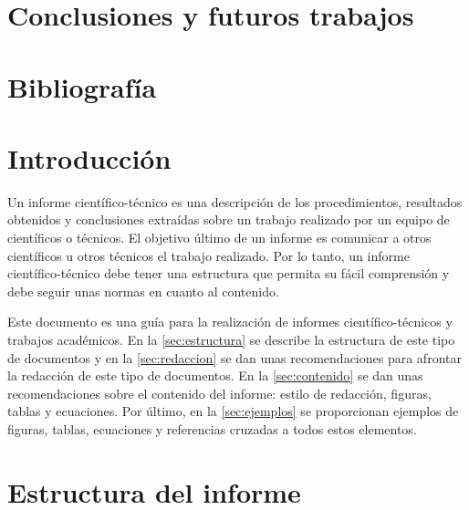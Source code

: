 \documentclass[11pt]{article}
\begin{document}
\section{Conclusiones y futuros trabajos}



\section{Bibliografía}

















\section{Introducción}
\label{sec:introduccion}

Un informe científico-técnico es una descripción de los procedimientos, resultados obtenidos y conclusiones extraídas sobre un trabajo realizado por un equipo de científicos o técnicos. El objetivo último de un informe es comunicar a otros científicos u otros técnicos el trabajo realizado. Por lo tanto, un informe científico-técnico debe tener una estructura que permita su fácil comprensión y debe seguir unas normas en cuanto al contenido.

Este documento es una guía para la realización de informes científico-técnicos y trabajos académicos. En la \autoref{sec:estructura} se describe la estructura de este tipo de documentos y en la \autoref{sec:redaccion} se dan unas recomendaciones para afrontar la redacción de este tipo de documentos. En la \autoref{sec:contenido} se dan unas recomendaciones sobre el contenido del informe: estilo de redacción, figuras, tablas y ecuaciones. Por último, en la \autoref{sec:ejemplos} se proporcionan ejemplos de figuras, tablas, ecuaciones y referencias cruzadas a todos estos elementos.


\section{Estructura del informe}
\label{sec:estructura}
\end{document}
